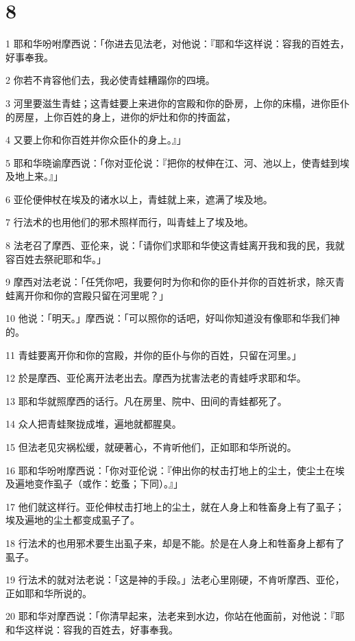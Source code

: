 \chapter{8}

\par 1 耶和华吩咐摩西说：「你进去见法老，对他说：『耶和华这样说：容我的百姓去，好事奉我。
\par 2 你若不肯容他们去，我必使青蛙糟蹋你的四境。
\par 3 河里要滋生青蛙；这青蛙要上来进你的宫殿和你的卧房，上你的床榻，进你臣仆的房屋，上你百姓的身上，进你的炉灶和你的抟面盆，
\par 4 又要上你和你百姓并你众臣仆的身上。』」
\par 5 耶和华晓谕摩西说：「你对亚伦说：『把你的杖伸在江、河、池以上，使青蛙到埃及地上来。』」
\par 6 亚伦便伸杖在埃及的诸水以上，青蛙就上来，遮满了埃及地。
\par 7 行法术的也用他们的邪术照样而行，叫青蛙上了埃及地。
\par 8 法老召了摩西、亚伦来，说：「请你们求耶和华使这青蛙离开我和我的民，我就容百姓去祭祀耶和华。」
\par 9 摩西对法老说：「任凭你吧，我要何时为你和你的臣仆并你的百姓祈求，除灭青蛙离开你和你的宫殿只留在河里呢？」
\par 10 他说：「明天。」摩西说：「可以照你的话吧，好叫你知道没有像耶和华我们神的。
\par 11 青蛙要离开你和你的宫殿，并你的臣仆与你的百姓，只留在河里。」
\par 12 於是摩西、亚伦离开法老出去。摩西为扰害法老的青蛙呼求耶和华。
\par 13 耶和华就照摩西的话行。凡在房里、院中、田间的青蛙都死了。
\par 14 众人把青蛙聚拢成堆，遍地就都腥臭。
\par 15 但法老见灾祸松缓，就硬著心，不肯听他们，正如耶和华所说的。
\par 16 耶和华吩咐摩西说：「你对亚伦说：『伸出你的杖击打地上的尘土，使尘土在埃及遍地变作虱子（或作：虼蚤；下同）。』」
\par 17 他们就这样行。亚伦伸杖击打地上的尘土，就在人身上和牲畜身上有了虱子；埃及遍地的尘土都变成虱子了。
\par 18 行法术的也用邪术要生出虱子来，却是不能。於是在人身上和牲畜身上都有了虱子。
\par 19 行法术的就对法老说：「这是神的手段。」法老心里刚硬，不肯听摩西、亚伦，正如耶和华所说的。
\par 20 耶和华对摩西说：「你清早起来，法老来到水边，你站在他面前，对他说：『耶和华这样说：容我的百姓去，好事奉我。
